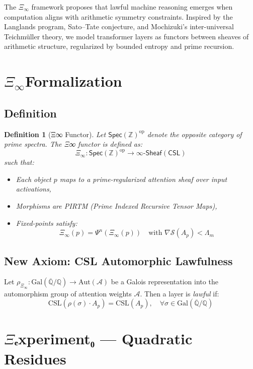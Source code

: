 \documentclass[12]{amsart}
\theoremstyle{plain}
\newtheorem{definition}[theorem]{Definition}
\begin{document}
The $\Xi_\infty$ framework proposes that lawful machine reasoning emerges when computation aligns with arithmetic symmetry constraints. Inspired by the Langlands program, Sato–Tate conjecture, and Mochizuki's inter-universal Teichmüller theory, we model transformer layers as functors between sheaves of arithmetic structure, regularized by bounded entropy and prime recursion.

\section{$\Xi_\infty$Formalization}

\subsection{Definition}

\begin{definition}[Ξ∞ Functor]
Let $\mathsf{Spec}(\mathbb{Z})^\mathrm{op}$ denote the opposite category of prime spectra. The Ξ∞ functor is defined as:
\[
\Xi_\infty : \mathsf{Spec}(\mathbb{Z})^\mathrm{op} \longrightarrow \infty\text{-}\mathsf{Sheaf}(\mathsf{CSL})
\]
such that:
\begin{itemize}[noitemsep]
  \item Each object $p$ maps to a prime-regularized attention sheaf over input activations,
  \item Morphisms are PIRTM (Prime Indexed Recursive Tensor Maps),
  \item Fixed-points satisfy:
  \[
  \Xi_\infty(p) = \Psi^{n}(\Xi_\infty(p)) \quad \text{with } \nabla \mathcal{S}(A_p) < \Lambda_m
  \]
\end{itemize}
\end{definition}

\subsection{New Axiom: CSL Automorphic Lawfulness}
\begin{axiom}
Let $\rho_{\Xi_\infty}: \mathrm{Gal}(\overline{\mathbb{Q}}/\mathbb{Q}) \to \mathrm{Aut}(\mathcal{A})$ be a Galois representation into the automorphism group of attention weights $\mathcal{A}$. Then a layer is \emph{lawful} if:
\[
\mathrm{CSL}(\rho(\sigma) \cdot A_p) = \mathrm{CSL}(A_p), \quad \forall \sigma \in \mathrm{Gal}(\overline{\mathbb{Q}}/\mathbb{Q})
\]
\end{axiom}

\section{$\Xi$ₑxperiment₀ — Quadratic Residues}
\end{document}
